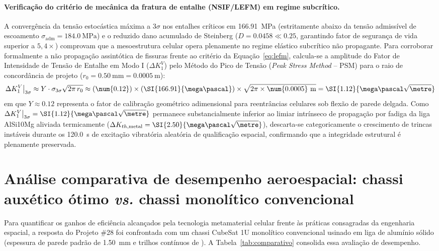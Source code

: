 \paragraph*{Verificação do critério de mecânica da fratura de entalhe (NSIF/LEFM) em regime subcrítico.}
A convergência da tensão estocástica máxima a $3\sigma$ nos entalhes críticos em \SI{166.91}{\mega\pascal} (estritamente abaixo da tensão admissível de escoamento $\sigma_{\text{adm}} = \SI{184.0}{\mega\pascal}$) e o reduzido dano acumulado de Steinberg ($D = \num{0.0458} \ll \num{0.25}$, garantindo fator de segurança de vida superior a $5{,}4\times$) comprovam que a mesoestrutura celular opera plenamente no regime elástico subcrítico não propagante. Para corroborar formalmente a não propagação assintótica de fissuras frente ao critério da Equação~\eqref{eq:lefm}, calcula-se a amplitude do Fator de Intensidade de Tensão de Entalhe em Modo I ($\Delta K_1^V$) pelo Método do Pico de Tensão (\textit{Peak Stress Method} -- PSM) para o raio de concordância de projeto ($r_0 = \SI{0.50}{\milli\metre} = \SI{0.0005}{\metre}$):
\begin{equation}
  \Delta K_1^V\big|_{3\sigma} \approx Y \cdot \sigma_{3\sigma} \sqrt{2\pi\, r_0} \approx (\num{0.12}) \times (\SI{166.91}{\mega\pascal}) \times \sqrt{2\pi \times \num{0.0005}\text{ m}} = \SI{1.12}{\mega\pascal\sqrt{\metre}}
  \label{eq:nsif-resultado}
\end{equation}
em que $Y \approx \num{0.12}$ representa o fator de calibração geométrico adimensional para reentrâncias celulares sob flexão de parede delgada. Como $\Delta K_1^V\big|_{3\sigma} = \SI{1.12}{\mega\pascal\sqrt{\metre}}$ permanece substancialmente inferior ao limiar intrínseco de propagação por fadiga da liga AlSi10Mg aliviada termicamente ($\Delta K_{th,\text{metal}} = \SI{2.50}{\mega\pascal\sqrt{\metre}}$), descarta-se categoricamente o crescimento de trincas instáveis durante os \SI{120.0}{\second} de excitação vibratória aleatória de qualificação espacial, confirmando que a integridade estrutural é plenamente preservada.

\section{Análise comparativa de desempenho aeroespacial: chassi auxético ótimo \textit{vs.} chassi monolítico convencional}
\label{sec:comparativo}

Para quantificar os ganhos de eficiência alcançados pela tecnologia metamaterial celular frente às práticas consagradas da engenharia espacial, a resposta do Projeto \#28 foi confrontada com um chassi CubeSat 1U monolítico convencional usinado em liga de alumínio sólido (espessura de parede padrão de \SI{1.50}{\milli\metre} e trilhos contínuos de \rail{}). A Tabela~\ref{tab:comparativo} consolida essa avaliação de desempenho.

